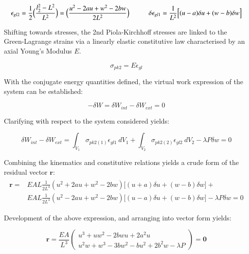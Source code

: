 \begin{equation} 
\epsilon_{gl2} = \frac{1}{2}
\Big(\frac{l_2^2-L^2}{L^2}\Big)
=
\Big(\frac{u^2 - 2au +w^2 -2bw}{2L^2}\Big)
\hspace{10mm}
\delta\epsilon_{gl1} = 
\frac{1}{L^2}
\Big[
(u-a)\delta u
+
(w-b)\delta w
\Big]
\label{eqapp0_2_2}
\end{equation}

Shifting towards stresses, the 2nd Piola-Kirchhoff stresses are linked to the Green-Lagrange strains via a linearly elastic constitutive law characterised by an axial Young's Modulus $E$.

\begin{equation} 
\sigma_{pk2} = E \epsilon_{gl}
\label{eqapp0_3}
\end{equation}

With the conjugate energy quantities defined, the virtual work expression of the system can be established:

\begin{equation} 
-\delta W = \delta W_{int} - \delta W_{ext} = 0
\label{eqapp0_4}
\end{equation}

Clarifying with respect to the system considered yields:

\begin{equation} 
\delta W_{int} - \delta W_{ext} = 
\int_{V_1} \sigma_{pk2(1)} \epsilon_{gl1}
\ dV_1
+
\int_{V_2} \sigma_{pk2(2)} \epsilon_{gl2}
\ dV_2
- \lambda P \delta w = 0
\label{eqapp0_5}
\end{equation}

Combining the kinematics and constitutive relations yields a crude form of the residual vector $\mathbf{r}$:
\begin{gather} 
	\begin{aligned}
		\mathbf{r} = 
		&EAL
		\frac{1}{2L^4}
		(u^2 + 2au +w^2 -2bw)
		\Big[
		(u+a)\delta u
		+
		(w-b)\delta w
		\Big] +
		\\
		&EAL
		\frac{1}{2L^4}
		(u^2 - 2au +w^2 -2bw)
		\Big[
		(u-a)\delta u
		+
		(w-b)\delta w
		\Big] 
		- \lambda P \delta w = 0
		\label{eqapp0_6_0}
	\end{aligned}
\end{gather}

Development of the above expression, and arranging into vector form yields:

\begin{equation} 
\mathbf{r} = 
\frac{EA}{L^3}
\begin{pmatrix}
u^3+uw^2-2bwu+2a^2u \\
u^2w + w^3 - 3bw^2 - bu^2 +2b^2w - \lambda P
\end{pmatrix}
=
\mathbf{0}
\label{eqapp0_6_1}
\end{equation}

